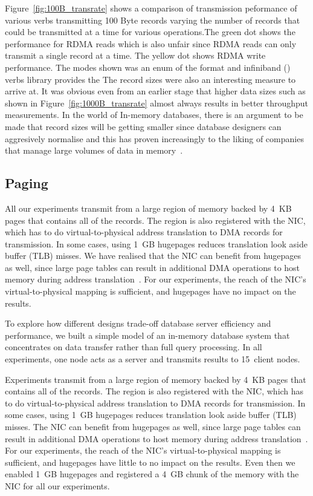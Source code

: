 Figure~\ref{fig:100B_transrate} shows a comparison of transmission
peformance of various verbs transmitting 100 Byte records varying the number of records
that could be transmitted at a time for various operations.The green dot shows
the performance for RDMA reads which is also unfair
since RDMA reads can only transmit a single record at a time. The yellow dot
shows RDMA write performance. The modes shown was an enum of the format 
 and infiniband 
() verbs library provides the  The record sizes were 
also an interesting measure to arrive at. It was obvious even from an earlier stage
that higher data sizes such as shown in Figure~\ref{fig:1000B_transrate} almost 
always results in better throughput measurements. In the world of In-memory databases,
there is an argument to be made that record sizes will be getting smaller since 
database designers can aggresively normalise and this has proven increasingly to
the liking of companies that manage large volumes of data in memory~\cite{fb-memcache,fb-workload}.
\setlength{\fboxsep}{10pt}
\setlength{\fboxrule}{1pt}

\subsection{Paging}
All our experiments transmit from a large region of memory backed by 4~KB pages
that contains all of the records. The region is also
registered with the NIC, which has to do virtual-to-physical address
translation to DMA records for transmission.
In some cases, using 1~GB hugepages reduces translation look aside buffer
(TLB) misses. We have realised that the NIC can benefit from
hugepages as well, since large page tables can result in additional
DMA operations to host memory during address translation~\cite{farm,rdma}. For
our experiments, the reach of the NIC's virtual-to-physical mapping is
sufficient, and hugepages have no impact on the results.


To explore how different designs trade-off database server efficiency and
performance, we built a simple model of an in-memory database system that
concentrates on data transfer rather than full query processing.  In all experiments, one node acts
as a server and transmits results to 15~client nodes.

Experiments transmit from a large region of memory backed by 4~KB pages that contains all of
the records.  The region is also
registered with the NIC, which has to do virtual-to-physical address
translation to DMA records for transmission.
In some cases, using 1~GB hugepages reduces translation look aside buffer
(TLB) misses.  The NIC can benefit from
hugepages as well, since large page tables can result in additional
DMA operations to host memory during address translation~\cite{farm,rdma}. For
our experiments, the reach of the NIC's virtual-to-physical mapping is
sufficient, and hugepages have little to no impact on the results. Even then we 
enabled 1~GB hugepages and registered a 4~GB chunk of the memory with the NIC 
for all our experiments.

